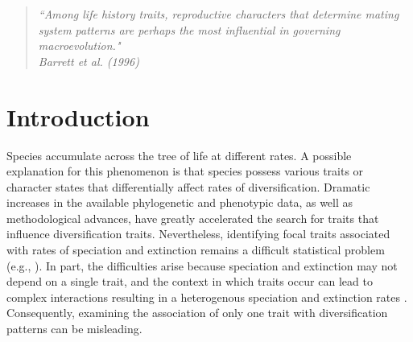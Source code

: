 \begin{quote}
\em{``Among life history traits, reproductive characters that determine mating system patterns are perhaps the most influential in governing macroevolution." 
}
\\
\hspace*{\fill}\rm{ Barrett et al. (1996)}
\end{quote}

\section{Introduction}



Species accumulate across the tree of life at different rates. 
A possible explanation for this phenomenon is that species possess various traits or character states that differentially affect rates of diversification. 
Dramatic increases in the available phylogenetic and phenotypic data, as well as methodological advances, have greatly accelerated the search for traits that influence diversification traits.
Nevertheless, identifying focal traits associated with rates of speciation and extinction remains a difficult statistical problem (e.g., \citealt{maddison_2015, rabosky_2015, moore_2016, fitzjohn_2009, goldberg_2012, beaulieu_2016, rabosky_2017}). %
In part, the difficulties arise because speciation and extinction may not depend on a single trait, and the context in which traits occur can lead to complex interactions resulting in a heterogenous speciation and extinction rates \citep{beaulieu_2016, caetano_2018, herrera_2018}.
Consequently, examining the association of only one trait with diversification patterns can be misleading. 

